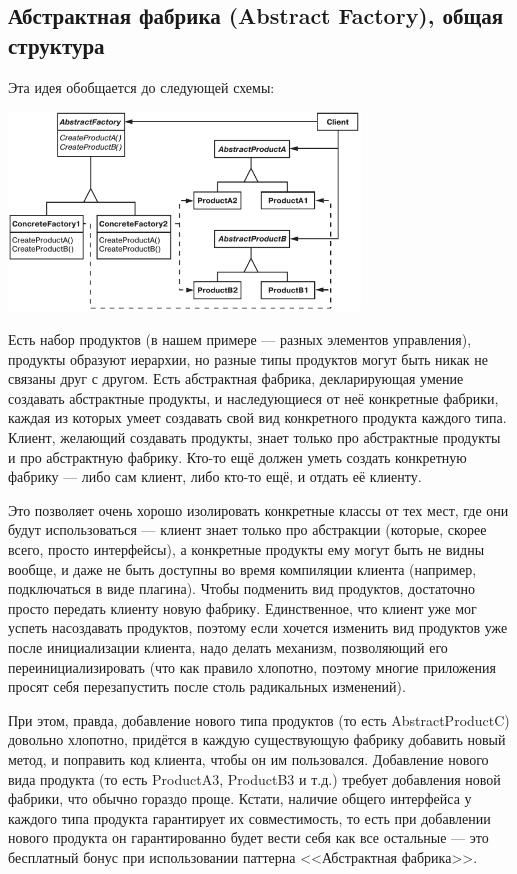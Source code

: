 \documentclass{../../text-style}
\begin{document}
\subsection{Абстрактная фабрика (Abstract Factory), общая структура}

Эта идея обобщается до следующей схемы:

\begin{center}
    \includegraphics[width=0.7\textwidth]{abstractFactory.png}
\end{center}

Есть набор продуктов (в нашем примере --- разных элементов управления), продукты образуют иерархии, но разные типы продуктов могут быть никак не связаны друг с другом. Есть абстрактная фабрика, декларирующая умение создавать абстрактные продукты, и наследующиеся от неё конкретные фабрики, каждая из которых умеет создавать свой вид конкретного продукта каждого типа. Клиент, желающий создавать продукты, знает только про абстрактные продукты и про абстрактную фабрику. Кто-то ещё должен уметь создать конкретную фабрику --- либо сам клиент, либо кто-то ещё, и отдать её клиенту.

Это позволяет очень хорошо изолировать конкретные классы от тех мест, где они будут использоваться --- клиент знает только про абстракции (которые, скорее всего, просто интерфейсы), а конкретные продукты ему могут быть не видны вообще, и даже не быть доступны во время компиляции клиента (например, подключаться в виде плагина). Чтобы подменить вид продуктов, достаточно просто передать клиенту новую фабрику. Единственное, что клиент уже мог успеть насоздавать продуктов, поэтому если хочется изменить вид продуктов уже после инициализации клиента, надо делать механизм, позволяющий его переинициализировать (что как правило хлопотно, поэтому многие приложения просят себя перезапустить после столь радикальных изменений).

При этом, правда, добавление нового типа продуктов (то есть AbstractProductC) довольно хлопотно, придётся в каждую существующую фабрику добавить новый метод, и поправить код клиента, чтобы он им пользовался. Добавление нового вида продукта (то есть ProductA3,  ProductB3 и т.д.) требует добавления новой фабрики, что обычно гораздо проще. Кстати, наличие общего интерфейса у каждого типа продукта гарантирует их совместимость, то есть при добавлении нового продукта он гарантированно будет вести себя как все остальные --- это бесплатный бонус при использовании паттерна <<Абстрактная фабрика>>.
\end{document}
